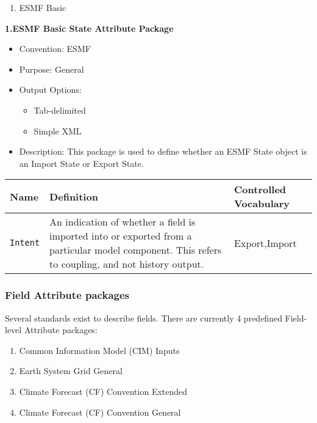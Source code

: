 \begin{enumerate}
    \item ESMF Basic
\end{enumerate}



\vspace{.20in}
{\bf 1.ESMF Basic State Attribute Package}

\begin{itemize}
    \item Convention: ESMF
    \item Purpose: General
    \item Output Options:
    \begin{itemize}
        \item Tab-delimited
        \item Simple XML 
    \end{itemize}
    \item Description: This package is used to define whether an ESMF State object is an Import State or Export State.   
\end{itemize}

\begin{tabular}{|p{5cm}|p{7cm}|p{5cm}|}
    {\bf Name } & {\bf Definition} & {\bf Controlled Vocabulary} \\
    \hline\hline
    {\tt Intent} & An indication of whether a field is imported into or exported from a particular model component. This refers to coupling, and not history output. & Export,Import \\
\end{tabular}


\vspace{.20in}
\subsubsection{Field Attribute packages}
\label{FieldAttributePackages}

Several standards exist to describe fields. There are currently 4 predefined Field-level Attribute packages:

\begin{enumerate}
    \item Common Information Model (CIM) Inputs
    \item Earth System Grid General
    \item Climate Forecast (CF) Convention Extended
    \item Climate Forecast (CF) Convention General
\end{enumerate}



